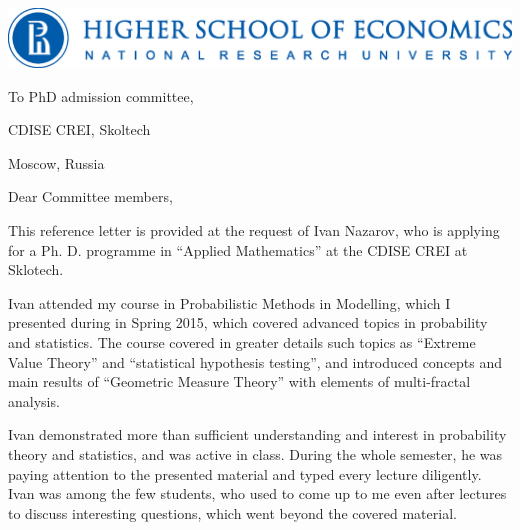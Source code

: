 \documentclass[14pt]{extarticle}
\begin{document}
\includegraphics[scale=0.55]{logo_hse_cmyk_e.eps}

\vspace{1.5cm}

\begin{minipage}{0.5\linewidth}
To PhD admission committee, \par
CDISE CREI, Skoltech \par
Moscow, Russia \par
\end{minipage} \par\bigskip

\hfill\par
\hfill\par

Dear Committee members, \par\bigskip

This reference letter is provided at the request of Ivan Nazarov, who is applying
for a Ph. D. programme in ``Applied Mathematics'' at the CDISE CREI at Sklotech.
\par\medskip

Ivan attended my course in Probabilistic Methods in Modelling, which I presented
during in Spring 2015, which covered advanced topics in probability and statistics.
The course covered in greater details such topics as ``Extreme Value Theory'' and
``statistical hypothesis testing'', and introduced concepts and main results of
``Geometric Measure Theory'' with elements of multi-fractal analysis. \par\medskip

Ivan demonstrated more than sufficient understanding and interest in probability
theory and statistics, and was active in class. During the whole semester, he was
paying attention to the presented material and typed every lecture diligently. Ivan
was among the few students, who used to come up to me even after lectures to
discuss interesting questions, which went beyond the covered material. \par\medskip
\end{document}
